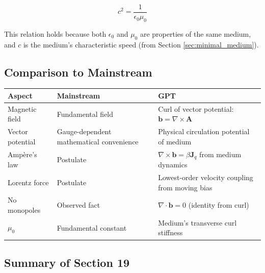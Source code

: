 \documentclass[12pt, a4paper]{article}
\begin{document}
\[
c^2 = \frac{1}{\epsilon_0 \mu_0}
\]

This relation holds because both \( \epsilon_0 \) and \( \mu_0 \) are properties of the same medium, and \( c \) is the medium's characteristic speed (from Section \ref{sec:minimal_medium}).

\subsection{Comparison to Mainstream}
\label{subsec:magnetism_comparison}

\begin{center}
\begin{tabular}{|p{3.5cm}|p{5cm}|p{5cm}|}
\hline
\textbf{Aspect} & \textbf{Mainstream} & \textbf{GPT} \\
\hline
Magnetic field & Fundamental field & Curl of vector potential: \( \mathbf{b} = \nabla \times \mathbf{A} \) \\
\hline
Vector potential & Gauge-dependent mathematical convenience & Physical circulation potential of medium \\
\hline
Ampère's law & Postulate & \( \nabla \times \mathbf{b} = \beta \mathbf{J}_q \) from medium dynamics \\
\hline
Lorentz force & Postulate & Lowest-order velocity coupling from moving bias \\
\hline
No monopoles & Observed fact & \( \nabla \cdot \mathbf{b} = 0 \) (identity from curl) \\
\hline
\( \mu_0 \) & Fundamental constant & Medium's transverse curl stiffness \\
\hline
\end{tabular}
\end{center}

\subsection{Summary of Section 19}
\label{subsec:summary_19}
\end{document}
